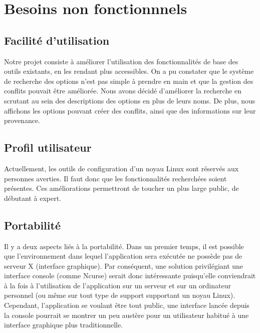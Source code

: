 \documentclass[16pts]{report}
\begin{document}
\chapter{Besoins non fonctionnnels}
\label{cha:Besoins non fonctionnnels}

\section{Facilité d'utilisation}
\label{sec:Facilité d'utilisation}

Notre projet consiste à améliorer l'utilisation des fonctionnalités de base des
outils existants, en les rendant plus accessibles. On a pu constater que le
système de recherche des options n'est pas simple à prendre en main et que la
gestion des conflits pouvait être améliorée.
Nous avons décidé d'améliorer la recherche en scrutant au sein des descriptions
des options en plus de leurs noms. De plus, nous affichons les options pouvant
créer des conflits, ainsi que des informations sur leur provenance.


\section{Profil utilisateur}
\label{sec:Profil utilisateur}

Actuellement, les outils de configuration d'un noyau Linux sont réservés aux
personnes averties. Il faut donc que les fonctionnalités recherchées soient
présentes. Ces améliorations permettront de toucher un plus large public, de
débutant à expert.


\section{Portabilité}
\label{sec:Portabilité}

Il y a deux aspects liés à la portabilité.
Dans un premier temps, il est possible que l'environnement dans lequel
l'application sera exécutée ne possède pas de serveur X (interface graphique).
Par conséquent, une solution privilégiant une interface console (comme Ncurse)
serait donc intéressante puisqu'elle conviendrait à la fois à l'utilisation de
l'application sur un serveur et sur un ordinateur personnel (ou même sur tout
type de support supportant un noyau Linux). Cependant, l'application se voulant
être tout public, une interface lancée depuis la console pourrait se montrer un
peu austère pour un utilisateur habitué à une interface graphique plus
traditionnelle.
\end{document}
